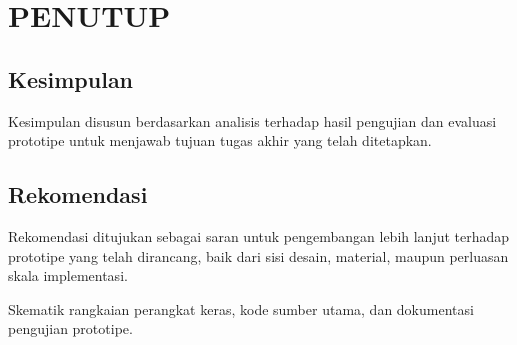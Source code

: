 \documentclass[prototipe,laporan]{itkta2025}
\begin{document}
\chapter{PENUTUP}
\section{Kesimpulan}
Kesimpulan disusun berdasarkan analisis terhadap hasil pengujian dan evaluasi prototipe untuk menjawab tujuan tugas akhir yang telah ditetapkan.

\section{Rekomendasi}
Rekomendasi ditujukan sebagai saran untuk pengembangan lebih lanjut terhadap prototipe yang telah dirancang, baik dari sisi desain, material, maupun perluasan skala implementasi.

\clearpage
{}
{}
\renewcommand{\bibname}{DAFTAR PUSTAKA}
\begin{singlespace}
  
  
\end{singlespace}

Skematik rangkaian perangkat keras, kode sumber utama, dan dokumentasi pengujian prototipe.


\makebackcoverandspine
\end{document}
